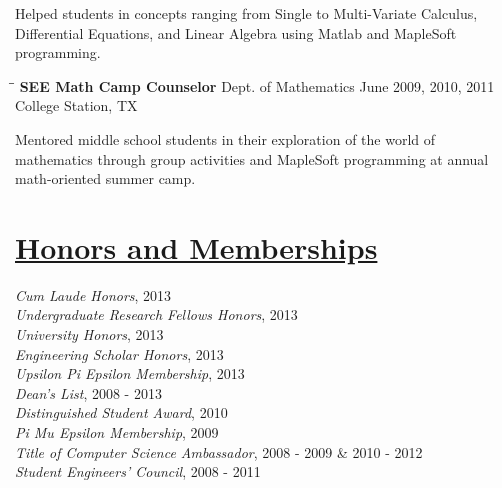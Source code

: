\documentclass[8pt]{res}
\begin{document}
\begin{resume}
\begin{tabbing}
    \end{tabbing}\vspace{-20pt}
    Helped students in concepts ranging from Single to Multi-Variate Calculus,\\
    Differential Equations, and Linear Algebra using Matlab and MapleSoft programming.
    \begin{tabbing}
      \hspace{2.3in}\= \hspace{2.6in}\= \kill %
      \textbf{SEE Math Camp Counselor}  \>Dept. of Mathematics \> June 2009, 2010, 2011\\ \>College Station, TX
    \end{tabbing}\vspace{-20pt}
    Mentored middle school students in their exploration of the world of\\
    mathematics through group activities and MapleSoft programming at annual\\
    math-oriented summer camp.


    \section{\underline{Honors and Memberships}}          
    \vspace{+0.02in}	
    \emph{Cum Laude Honors}, 2013 \\
    \emph{Undergraduate Research Fellows Honors}, 2013 \\
    \emph{University Honors}, 2013 \\
    \emph{Engineering Scholar Honors}, 2013 \\
    \emph{Upsilon Pi Epsilon Membership}, 2013 \\
    \emph{Dean's List}, 2008 - 2013 \\
    \emph{Distinguished Student Award}, 2010 \\
    \emph{Pi Mu Epsilon Membership}, 2009 \\
    \emph{Title of Computer Science Ambassador}, 2008 - 2009 \& 2010 - 2012 \\
    \emph{Student Engineers' Council}, 2008 - 2011 \\
    \vspace{-0.1in}	


\end{resume}
\end{document}
